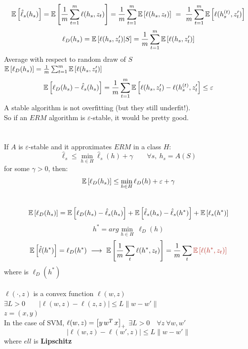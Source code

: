 \documentclass[../main.tex]{subfiles}
\begin{document}
$$
\mathbb{E} \left[ \hat{\ell}_s (h_s) \right] = \mathbb{E} \left[ \frac{1}{m} \sum_{t=1}^m \ell(h_s,z_t) \right] = \frac{1}{m} \sum_{t=1}^m \mathbb{E} \left[ \ell(h_s, z_t ) \right] \ = \ \frac{1}{m} \sum_{t=1}^m \mathbb{E} \left[ \ell(h_s^{(t)}, z_t') \right]
$$
$$
\ell_D(h_s) = \mathbb{E} \left[ \ell(h_s, z'_t) | S \right] = \frac{1}{m} \sum_{t=1}^m \mathbb{E} \left[ \ell(h_s, z'_t) \right]
$$
Average with respect to random draw of $S$\\
$
\mathbb{E} \left[ \ell_D (h_s) \right] = \frac{1}{m} \sum_{t=1}^m \mathbb{E} \left[ \ell(h_s, z'_t)\right]
$
$$
\mathbb{E} \left[ \ell_D(h_s) - \hat{\ell}_s (h_s) \right] = \frac{1}{m} \sum_{t=1}^m \mathbb{E} \left[ \ell(h_s, z'_t) - \ell(h_s^{(t)}, z'_t \right] \leq \varepsilon
$$
A stable algorithm is not overfitting (but they still underfit!).
\\So if an $ERM$ algorithm is $\varepsilon$-stable, it would be pretty good.
\\\\
\\
If \textbf{$A$} is $\varepsilon$-stable and it approximates $ERM$ in a class $H$: 
$$
\hat{\ell}_s \leq \min_{h \in H} \hat{\ell}_s (h) + \gamma \qquad \forall s, \ h_s = A(S)
$$ 
for some $\gamma > 0$, then:
$$
\mathbb{E} \left[ \ell_D (h_s) \right] \leq \min_{h \in H} \ell_D(h) + \varepsilon + \gamma
$$
\\
$$
\mathbb{E} \left[ \ell_D(h_s) \right] = \mathbb{E} \left[ \ell_D (h_s) - \hat{\ell}_s(h_s) \right] + \mathbb{E} \left[ \hat{\ell}_s(h_s) - \hat{\ell}_s (h^*) \right] + \mathbb{E} \left[ \ell_s (h^*) \right]
$$
$$
h^* = arg \min_{h \in H} \ \ell_D (h)
$$
$$
\barra{E} \left[ \hat{\ell}(h^*) \right] = \ell_D(h^*) \ \longrightarrow \ \barra{E} \left[ \frac{1}{m} \sum_t \ell(h^*, z_t) \right] = \frac{1}{m} \sum_t \red{\barra{E} \left[ \ell(h^*, z_t ) \right] }
$$
where  is $ \ell_D(h^*)$
\\\\
$
\ell(\cdot , z) 
$ is a convex function $\ell(w,z)$ \\ $\exists L > 0 \qquad | \ell(w,z)- \ell(z,z) | \leq L \| w-w'\|$
\\
$z = (x,y)$
\\
In the case of SVM, $\ell(w,z) = \left[ \- y \, w^T \, x \right]_+$
$ \exists L > 0 \quad \forall z \ \forall w, w'$ 
$$
| \ell(w,z) - \ell(w',z) | \leq L \| w-w'\|
$$
where $ell$ is \textbf{Lipschitz}
\\\\
\\
\end{document}
